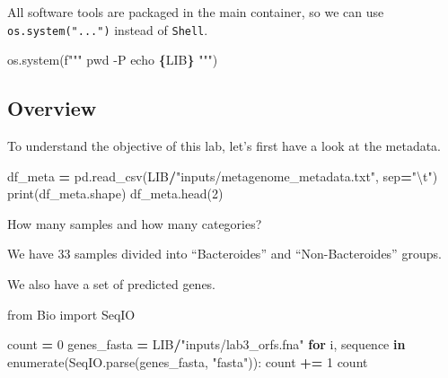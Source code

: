 \documentclass[
]{book}
\newenvironment{Shaded}{\begin{snugshade}}{\end{snugshade}}
\newcommand{\BuiltInTok}[1]{#1}
\newcommand{\CharTok}[1]{\textcolor[rgb]{0.31,0.60,0.02}{#1}}
\newcommand{\ControlFlowTok}[1]{\textcolor[rgb]{0.13,0.29,0.53}{\textbf{#1}}}
\newcommand{\DecValTok}[1]{\textcolor[rgb]{0.00,0.00,0.81}{#1}}
\newcommand{\ImportTok}[1]{#1}
\newcommand{\KeywordTok}[1]{\textcolor[rgb]{0.13,0.29,0.53}{\textbf{#1}}}
\newcommand{\NormalTok}[1]{#1}
\newcommand{\OperatorTok}[1]{\textcolor[rgb]{0.81,0.36,0.00}{\textbf{#1}}}
\newcommand{\SpecialCharTok}[1]{\textcolor[rgb]{0.81,0.36,0.00}{\textbf{#1}}}
\newcommand{\SpecialStringTok}[1]{\textcolor[rgb]{0.31,0.60,0.02}{#1}}
\newcommand{\StringTok}[1]{\textcolor[rgb]{0.31,0.60,0.02}{#1}}
\begin{document}
All software tools are packaged in the main container, so we can use \texttt{os.system("...")} instead of \texttt{Shell}.

\begin{Shaded}
\begin{Highlighting}[numbers=left,,]
\NormalTok{os.system(}\SpecialStringTok{f"""}
\SpecialStringTok{pwd {-}P}
\SpecialStringTok{echo }\SpecialCharTok{\{}\NormalTok{LIB}\SpecialCharTok{\}}
\SpecialStringTok{"""}\NormalTok{)}
\end{Highlighting}
\end{Shaded}

\subsection{Overview}\label{overview-2}

To understand the objective of this lab, let's first have a look at the metadata.

\begin{Shaded}
\begin{Highlighting}[numbers=left,,]
\NormalTok{df\_meta }\OperatorTok{=}\NormalTok{ pd.read\_csv(LIB}\OperatorTok{/}\StringTok{"inputs/metagenome\_metadata.txt"}\NormalTok{, sep}\OperatorTok{=}\StringTok{"}\CharTok{\textbackslash{}t}\StringTok{"}\NormalTok{)}
\BuiltInTok{print}\NormalTok{(df\_meta.shape)}
\NormalTok{df\_meta.head(}\DecValTok{2}\NormalTok{)}
\end{Highlighting}
\end{Shaded}

How many samples and how many categories?

We have 33 samples divided into ``Bacteroides'' and ``Non-Bacteroides'' groups.

We also have a set of predicted genes.

\begin{Shaded}
\begin{Highlighting}[numbers=left,,]
\ImportTok{from}\NormalTok{ Bio }\ImportTok{import}\NormalTok{ SeqIO}

\NormalTok{count }\OperatorTok{=} \DecValTok{0}
\NormalTok{genes\_fasta }\OperatorTok{=}\NormalTok{ LIB}\OperatorTok{/}\StringTok{"inputs/lab3\_orfs.fna"}
\ControlFlowTok{for}\NormalTok{ i, sequence }\KeywordTok{in} \BuiltInTok{enumerate}\NormalTok{(SeqIO.parse(genes\_fasta, }\StringTok{"fasta"}\NormalTok{)):}
\NormalTok{    count }\OperatorTok{+=} \DecValTok{1}
\NormalTok{count}
\end{Highlighting}
\end{Shaded}
\end{document}
